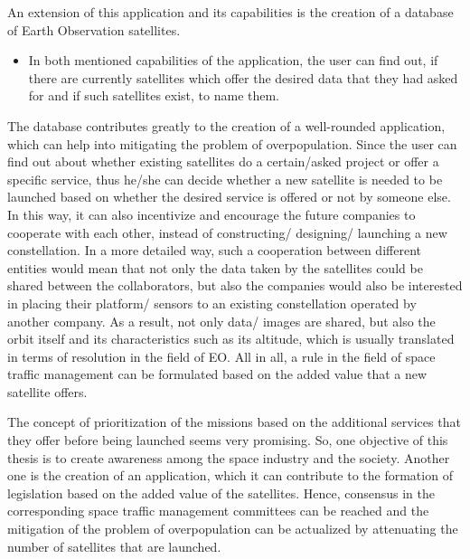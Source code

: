 An extension of this application and its capabilities is the creation of a database of Earth Observation satellites.

\begin{itemize}
\item In both mentioned capabilities of the application, the user can find out, if there are currently satellites which offer the desired data that they had asked for and if such satellites exist, to name them.
\end{itemize}

The database contributes greatly to the creation of a well-rounded application, which can help into mitigating the problem of overpopulation. Since the user can find out about whether existing satellites do a certain/asked project or offer a specific service, thus he/she can decide whether a new satellite is needed to be launched based on whether the desired service is offered or not by someone else. In this way, it can also incentivize and encourage the future companies to cooperate with each other, instead of constructing/ designing/ launching a new constellation. In a more detailed way, such a cooperation between different entities would mean that not only the data taken by the satellites could be shared between the collaborators, but also the companies would also be interested in placing their platform/ sensors to an existing constellation operated by another company. As a result, not only data/ images are shared, but also the orbit itself and its characteristics such as its altitude, which is usually translated in terms of resolution in the field of EO. All in all, a rule in the field of space traffic management can be formulated based on the added value that a new satellite offers.

The concept of prioritization of the missions based on the additional services that they offer before being launched seems very promising. So, one objective of this thesis is to create awareness among the space industry and the society. Another one is the creation of an application, which it can contribute to the formation of legislation based on the added value of the satellites. Hence, consensus in the corresponding space traffic management committees can be reached and the mitigation of the problem of overpopulation can be actualized by attenuating the number of satellites that are launched.


